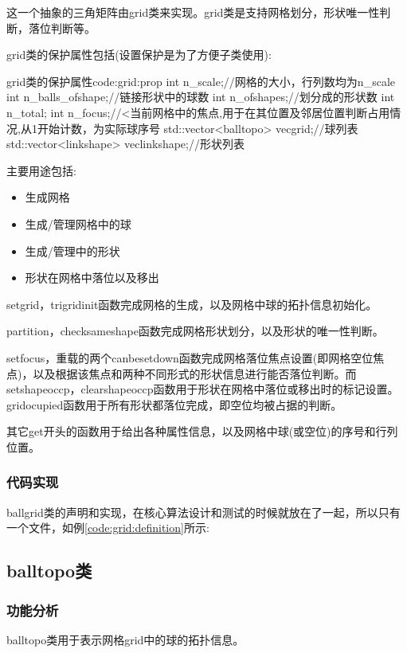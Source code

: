 \documentclass[11pt,twoside]{article} %
\begin{document}
这一个抽象的三角矩阵由grid类来实现。grid类是支持网格划分，形状唯一性判断，落位判断等。

grid类的保护属性包括(设置保护是为了方便子类使用):
\begin{codecpp}{grid类的保护属性}{code:grid:prop}
    int n_scale;//网格的大小，行列数均为n_scale
	int n_balls_ofshape;//链接形状中的球数
	int n_ofshapes;//划分成的形状数
    int n_total;
	int n_focus;//<当前网格中的焦点,用于在其位置及邻居位置判断占用情况,从1开始计数，为实际球序号
    std::vector<balltopo> vecgrid;//球列表
	std::vector<linkshape> veclinkshape;//形状列表
\end{codecpp}

主要用途包括:
\begin{itemize}
  \item 生成网格
  \item 生成/管理网格中的球
  \item 生成/管理中的形状
  \item 形状在网格中落位以及移出
\end{itemize}

setgrid，trigridinit函数完成网格的生成，以及网格中球的拓扑信息初始化。

partition，checksameshape函数完成网格形状划分，以及形状的唯一性判断。

setfocus，重载的两个canbesetdown函数完成网格落位焦点设置(即网格空位焦点)，以及根据该焦点和两种不同形式的形状信息进行能否落位判断。而setshapeoccp，clearshapeoccp函数用于形状在网格中落位或移出时的标记设置。gridocupied函数用于所有形状都落位完成，即空位均被占据的判断。

其它get开头的函数用于给出各种属性信息，以及网格中球(或空位)的序号和行列位置。

\subsubsection{代码实现}
ballgrid类的声明和实现，在核心算法设计和测试的时候就放在了一起，所以只有一个文件，如例\ref{code:grid:definition}所示:



\subsection{balltopo类}

\subsubsection{功能分析}
balltopo类用于表示网格grid中的球的拓扑信息。
\end{document}

